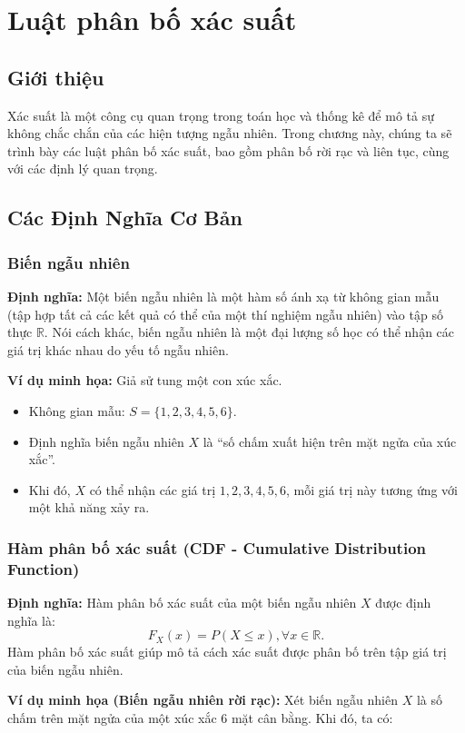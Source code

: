 \chapter{Luật phân bố xác suất}
\section{Giới thiệu}
Xác suất là một công cụ quan trọng trong toán học và thống kê để mô tả sự không chắc chắn của các hiện tượng ngẫu nhiên. Trong chương này, chúng ta sẽ trình bày các luật phân bố xác suất, bao gồm phân bố rời rạc và liên tục, cùng với các định lý quan trọng.

\section{Các Định Nghĩa Cơ Bản}

\subsection{Biến ngẫu nhiên}
\textbf{Định nghĩa:} Một biến ngẫu nhiên là một hàm số ánh xạ từ không gian mẫu (tập hợp tất cả các kết quả có thể của một thí nghiệm ngẫu nhiên) vào tập số thực $\mathbb{R}$. Nói cách khác, biến ngẫu nhiên là một đại lượng số học có thể nhận các giá trị khác nhau do yếu tố ngẫu nhiên.

\textbf{Ví dụ minh họa:} Giả sử tung một con xúc xắc.

\begin{itemize}
    \item Không gian mẫu: $S = \{1,2,3,4,5,6\}$.
    \item Định nghĩa biến ngẫu nhiên $X$ là ``số chấm xuất hiện trên mặt ngửa của xúc xắc''.
    \item Khi đó, $X$ có thể nhận các giá trị $1,2,3,4,5,6$, mỗi giá trị này tương ứng với một khả năng xảy ra.
\end{itemize}

\subsection{Hàm phân bố xác suất (CDF - Cumulative Distribution Function)}
\textbf{Định nghĩa:} Hàm phân bố xác suất của một biến ngẫu nhiên $X$ được định nghĩa là:
\[ F_X(x) = P(X \leq x), \forall x \in \mathbb{R}. \]
Hàm phân bố xác suất giúp mô tả cách xác suất được phân bố trên tập giá trị của biến ngẫu nhiên.

\textbf{Ví dụ minh họa (Biến ngẫu nhiên rời rạc):} Xét biến ngẫu nhiên $X$ là số chấm trên mặt ngửa của một xúc xắc 6 mặt cân bằng. Khi đó, ta có:

